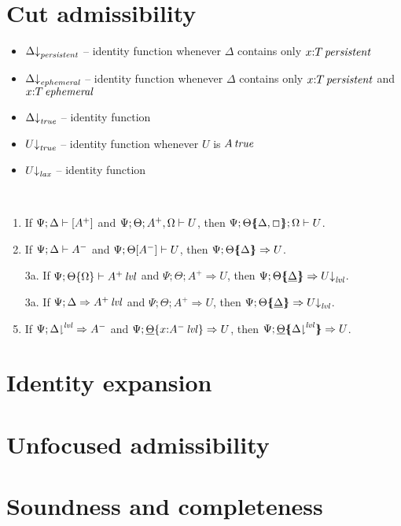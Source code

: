 \section{Cut admissibility}

\begin{itemize}
\item $\Delta{\downarrow}_{{\it persistent}}$ -- identity function whenever $\Delta$ contains only $x{:}{T}\,{{\it persistent}}$
\item $\Delta{\downarrow}_{{\it ephemeral}}$ -- identity function whenever $\Delta$ contains only $x{:}{T}\,{{\it persistent}}$ and $x{:}{T}\,{{\it ephemeral}}$
\item $\Delta{\downarrow}_{{\it true}}$ -- identity function
\end{itemize}

\begin{itemize}
\item $U{\downarrow}_{{\it true}}$ -- identity function whenever $U$ is ${A}\,{{\it true}}$
\item $U{\downarrow}_{{\it lax}}$ -- identity function
\end{itemize}



\begin{theorem}~
\begin{enumerate}
\item If ${\Psi};{\Delta} \vdash {[ A^+ ]}$
      and ${\Psi};{\Theta};{A^+,\Omega} \vdash {U}$, 
      then ${\Psi};{{\Theta}\mbox{$\{\hspace{-4pt}\{$}{{\Delta},\Box}\mbox{$\}\hspace{-4pt}\}$}};{\Omega} \vdash {U}$.
\item If ${\Psi};{\Delta} \vdash {A^-}$ 
      and ${\Psi};{\Theta}[{A^-}] \vdash {U}$, 
      then $\Psi; {\Theta}\mbox{$\{\hspace{-4pt}\{$}{\Delta}\mbox{$\}\hspace{-4pt}\}$} \Rightarrow U$.
\item[3a.] If ${\Psi};{{\Theta}\{{\Omega}\mbox\}} \vdash {{A^+}\,{{\it lvl}}}$
      and $\Psi; \Theta; A^+ \Rightarrow U$,
      then $\Psi; {\Theta}\mbox{$\{\hspace{-4pt}\{$}{\underline{\Delta}}\mbox{$\}\hspace{-4pt}\}$} \Rightarrow U{\downarrow}_{{\it lvl}}$.
\item[3a.] If $\Psi; \Delta \Rightarrow {A^+}\,{{\it lvl}}$
      and $\Psi; \Theta; A^+ \Rightarrow U$,
      then $\Psi; {\Theta}\mbox{$\{\hspace{-4pt}\{$}{\underline{\Delta}}\mbox{$\}\hspace{-4pt}\}$} \Rightarrow U{\downarrow}_{{\it lvl}}$.
\item If $\Psi; {\Delta}{\downharpoonright}^{{\it lvl}} \Rightarrow {A^-}$
      and $\Psi; {\underline{\Theta}}\{{x{:}{A^-}\,{{\it lvl}}}\} \Rightarrow U$, 
      then $\Psi; {\underline{\Theta}}\mbox{$\{\hspace{-4pt}\{$}{\ensuremath{{\Delta}{\downharpoonright}^{{\it lvl}}}}\mbox{$\}\hspace{-4pt}\}$} \Rightarrow U$.
\end{enumerate}
\end{theorem}

\section{Identity expansion}

\section{Unfocused admissibility}

\section{Soundness and completeness}


